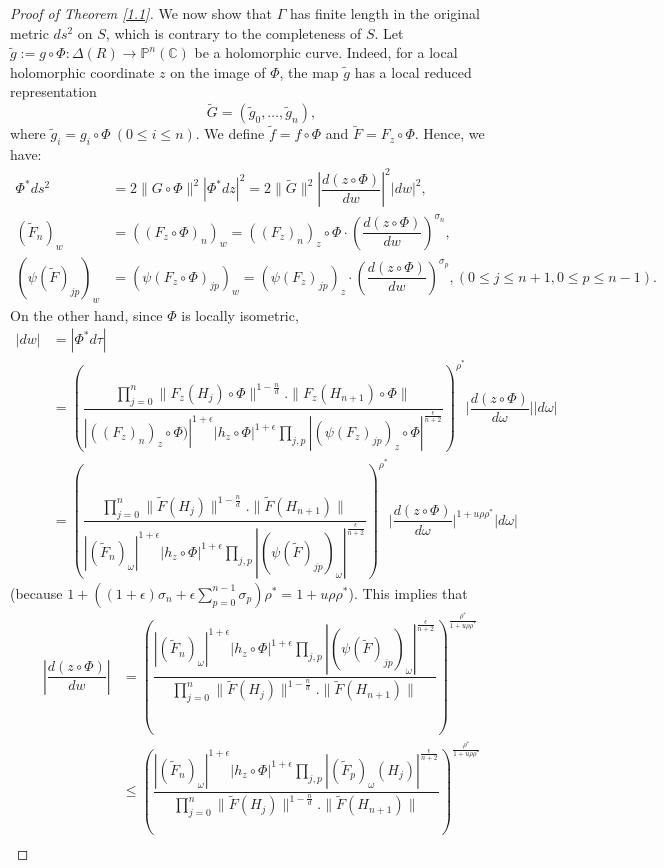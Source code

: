 \documentclass[12pt,article]{amsart}
\newcommand{\C}{{\mathbb{C}}}
\renewcommand{\P}{{\mathbb{P}}}
\numberwithin{equation}{section}
\begin{document}
\begin{proof}[Proof of Theorem \ref{1.1}]
We now show that $\Gamma$ has finite length in the original metric $ds^2$ on $S$, which is contrary to the completeness of $S$. Let $\tilde g:=g\circ\Phi :\Delta(R)\rightarrow \P^n(\C)$ be a holomorphic curve. Indeed, for a local holomorphic coordinate $z$ on the image of $\Phi$, the map $\tilde g$ has a local reduced representation
$$\tilde G=(\tilde g_0,\ldots,\tilde g_n),$$
where $\tilde g_i=g_i\circ\Phi\ (0\le i\le n).$ We define $\tilde f=f\circ\Phi$ and $\tilde F=F_z\circ\Phi$.
Hence, we have:
\begin{align*}
\Phi^*ds^2&=2\|G\circ\Phi\|^2|\Phi^*dz|^2=2\|\tilde G\|^2\left|\dfrac{d(z\circ\Phi)}{dw}\right|^2|dw|^2,\\
(\tilde F_{n})_w&=((F_z\circ\Phi)_{n})_w=((F_z)_{n})_z\circ\Phi\cdot\left(\dfrac{d(z\circ\Phi)}{dw}\right)^{\sigma_n},\\
(\psi(\tilde F)_{jp})_w&=(\psi(F_z\circ\Phi)_{jp})_w=(\psi(F_z)_{jp})_z\cdot\left(\dfrac{d(z\circ\Phi)}{dw}\right)^{\sigma_p}, (0\le j\le n+1,0\le p\le n-1).
\end{align*}
On the other hand, since $\Phi$ is locally isometric,
\begin{align*}
|dw|&=|\Phi^*d\tau|\\
&= \left (\dfrac{\prod_{j=0}^n\|F_z(H_j)\circ\Phi\|^{1-\frac{n}{d}}.\|F_z(H_{n+1})\circ\Phi\|}{|((F_z)_{n})_z\circ\Phi)|^{1+\epsilon}|h_{z}\circ\Phi|^{1+\epsilon}\prod_{j,p}|(\psi(F_z)_{jp})_z\circ\Phi|^{\frac{\epsilon}{n+2}}}\right)^{\rho^*}\biggl|\dfrac{d(z\circ\Phi)}{d\omega}\biggl||d\omega|\\
&= \left (\dfrac{\prod_{j=0}^n\|\tilde F(H_j)\|^{1-\frac{n}{d}}.\|\tilde F(H_{n+1})\|}{|(\tilde F_n)_{\omega}|^{1+\epsilon}|h_{z}\circ\Phi|^{1+\epsilon}\prod_{j,p}|(\psi(\tilde F)_{jp})_\omega|^{\frac{\epsilon}{n+2}}}\right)^{\rho^*}\biggl|\dfrac{d(z\circ\Phi)}{d\omega}\biggl|^{1+u\rho\rho^*}|d\omega|
\end{align*}
(because $1+((1+\epsilon)\sigma_n+\epsilon\sum_{p=0}^{n-1}\sigma_p)\rho^*=1+u\rho\rho^*$).
This implies that
\begin{align*}
\left|\dfrac{d(z\circ\Phi)}{dw}\right|&=\left (\dfrac{|(\tilde F_n)_{\omega}|^{1+\epsilon}|h_{z}\circ\Phi|^{1+\epsilon}\prod_{j,p}|(\psi(\tilde F)_{jp})_\omega|^{\frac{\epsilon}{n+2}}}{\prod_{j=0}^n\|\tilde F(H_j)\|^{1-\frac{n}{d}}.\|\tilde F(H_{n+1})\|}\right)^{\frac{\rho^*}{1+u\rho\rho^*}}\\
&\le \left (\dfrac{|(\tilde F_n)_{\omega}|^{1+\epsilon}|h_{z}\circ\Phi|^{1+\epsilon}\prod_{j,p}|(\tilde F_p)_\omega(H_j)|^{\frac{\epsilon}{n+2}}}{\prod_{j=0}^n\|\tilde F(H_j)\|^{1-\frac{n}{d}}.\|\tilde F(H_{n+1})\|}\right)^{\frac{\rho^*}{1+u\rho\rho^*}}\\

\end{align*}
\end{proof}
\end{document}
